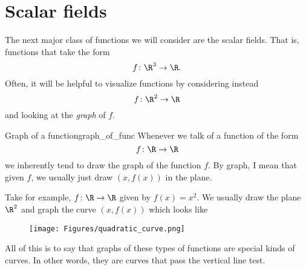         
        
        \section{Scalar fields}
        The next major class of functions we will consider are the scalar fields.  That is, functions that take the form
        \[
        f\colon \R^3 \to \R.
        \]
        Often, it will be helpful to visualize functions by considering instead
        \[
        f\colon \R^2 \to \R
        \]
        and looking at the \emph{graph} of $f$.  
        
        \begin{ex}{Graph of a function}{graph_of_func}
        Whenever we talk of a function of the form
        \[
        f\colon \R \to \R
        \]
        we inherently tend to draw the graph of the function $f$.  By graph, I mean that given $f$, we usually just draw $(x,f(x))$ in the plane.
        
        Take for example, $f\colon \R \to \R$ given by $f(x)=x^2$.  We usually draw the plane $\R^2$ and graph the curve $(x,f(x))$ which looks like
        \begin{figure}[H]
            \centering
            \texttt{[image: Figures/quadratic\_curve.png]}           
        \end{figure}
        All of this is to say that graphs of these types of functions are special kinds of curves.  In other words, they are curves that pass the vertical line test.
        \end{ex}
        
